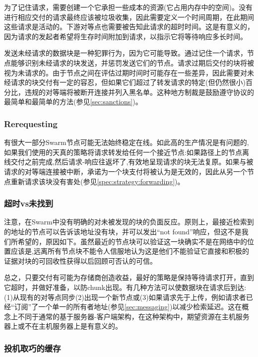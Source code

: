 为了记住请求，需要创建一个它承担一些成本的资源(它占用内存中的空间)。没有进行相应交付的请求最终应该被垃圾收集，因此需要定义一个时间周期，在此期间这些请求是活动的。下游对等点也需要被告知此请求的超时时间。这是有意义的，因为请求的发起者希望将生存时间附加到请求，以指示它将等待响应多长时间。

发送未经请求的数据块是一种犯罪行为，因为它可能导致。通过记住一个请求，节点能够识别未经请求的块发送，并惩罚发送它们的节点。请求过期后交付的块将被视为未请求的。由于节点之间在评估过期时间时可能存在一些差异，因此需要对未经请求的块交付有一定的容忍，但如果它们超过了转发请求的特定(但仍然很小)百分比，违规的对等端将被断开连接并列入黑名单。这种地方制裁是鼓励遵守协议的最简单和最简单的方法(参见\ref{sec:sanctions})。 

\subsubsection{Rerequesting}

有很大一部分Swarm节点可能无法始终稳定在线。如此高的生产情况是有问题的,如果我们使用的天真的策略将请求转发给任何一个接近节点:如果路径上的节点离线交付之前完成,然后请求-响应往返坏了,有效地呈现请求的块无法复原。如果与被请求的对等端连接被中断，承诺为一个块支付将被认为是无效的，因此从另一个节点重新请求该块没有害处(参见\ref{spec:strategy:forwarding})。


\subsubsection{超时vs未找到}

注意，在Swarm中没有明确的对未被发现的块的负面反应。原则上，最接近检索到的地址的节点可以告诉该地址没有块，并可以发出“not found”响应，但这不是我们所希望的，原因如下。虽然最近的节点块可以验证这一块确实不是在网络中的位置应该是,远离所有节点块不能令人信服地认为这是他们不能验证它直接和积极的证据对块的可回收性获得以后回顾可否认的可信。

总之，只要交付有可能为存储商创造收益，最好的策略是保持等待请求打开，直到它超时，并做好准备，以防chunk出现。有几种方法可以使数据块在请求后到达:(1)从现有的对等点同步(2)出现一个新节点或(3)如果请求先于上传，例如请求者已经“订阅”了一个单一的所有者地址(参见\ref{sec:messaging})以减少检索延迟。这在概念上不同于通常的基于服务器-客户端架构，在这种架构中，期望资源在主机服务器上或不在主机服务器上是有意义的。 
 

\subsubsection{投机取巧的缓存}

